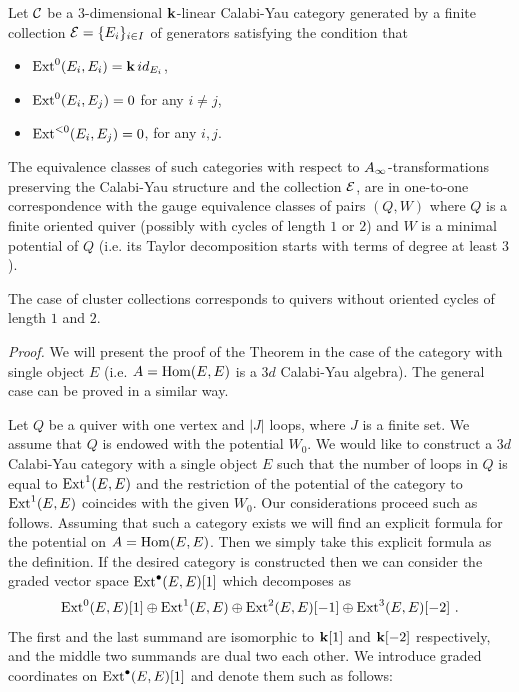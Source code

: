 \documentclass[12pt]{article}
\begin{document}
\begin{thm} Let ${\mathcal C}$ be a 3-dimensional ${\bf k}$-linear Calabi-Yau category generated by a finite  collection ${\cal E}=\{E_i\}_{i\in I}$ of generators satisfying the condition that
\begin{itemize}
\item
 $\operatorname{Ext}^0(E_i,E_i)={\bf k} \,id_{E_i}$, 
\item $\operatorname{Ext}^0(E_i,E_j)=0$ for any $i\ne j$,
\item $\operatorname{Ext}^{<0}(E_i,E_j)=0$, for any $i,j$.
\end{itemize}
The equivalence classes
of such categories with respect to $A_{\infty}$-transformations preserving the Calabi-Yau structure and the collection ${\cal E}$,
 are in one-to-one correspondence with the gauge equivalence classes of pairs
$(Q,W)$ where $Q$ is a finite oriented quiver (possibly with cycles of length $1$ or $2$) and $W$
is a minimal potential of $Q$ (i.e. its Taylor decomposition starts with terms of degree at least $3$).


\end{thm}

The case of cluster collections corresponds to quivers without oriented cycles of length $1$ and $2$.

 {\it Proof.} We will present  the proof of the Theorem in the case of the category with single object $E$ (i.e. $A=\operatorname{Hom}(E,E)$ is a $3d$ Calabi-Yau algebra). The general case  can be proved in a similar way.

Let $Q$ be a quiver with one vertex and $|J|$ loops, where $J$ is a finite set. We assume that $Q$ is endowed with the potential $W_0$. We would like to construct a $3d$ Calabi-Yau category with a single object $E$ such that the number of loops in $Q$ is equal to $\operatorname{Ext}^1(E,E)$ and the restriction of the potential of the category to $\operatorname{Ext}^1(E,E)$
coincides with the given $W_0$. Our considerations proceed such as follows. Assuming that such a category exists we will find an explicit formula for the potential on $A=\operatorname{Hom}(E,E)$. Then we simply take this explicit formula as the definition.
If the desired category is constructed then we can consider the graded vector space $\operatorname{Ext}^{\bullet}(E,E)[1]$ which decomposes as 
$$\operatorname{Ext}^{0}(E,E)[1]\oplus \operatorname{Ext}^1(E,E)\oplus \operatorname{Ext}^2(E,E)[-1]\oplus \operatorname{Ext}^3(E,E)[-2]\,\,.$$
The first and the last summand are isomorphic to ${\bf k}[1]$ and ${\bf k}[-2]$ respectively, and the middle two summands are dual two each other. We introduce graded coordinates on $\operatorname{Ext}^{\bullet}(E,E)[1]$ and denote them such as follows:
\end{document}
